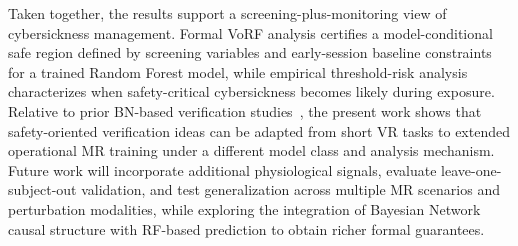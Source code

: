 \documentclass[review]{vgtc}              %
\begin{document}
Taken together, the results support a screening-plus-monitoring view of cybersickness management. Formal VoRF analysis certifies a model-conditional safe region defined by screening variables and early-session baseline constraints for a trained Random Forest model, while empirical threshold-risk analysis characterizes when safety-critical cybersickness becomes likely during exposure. Relative to prior BN-based verification studies~\cite{Wu2025BN}, the present work shows that safety-oriented verification ideas can be adapted from short VR tasks to extended operational MR training under a different model class and analysis mechanism. Future work will incorporate additional physiological signals, evaluate leave-one-subject-out validation, and test generalization across multiple MR scenarios and perturbation modalities, while exploring the integration of Bayesian Network causal structure with RF-based prediction to obtain richer formal guarantees.












\end{document}
